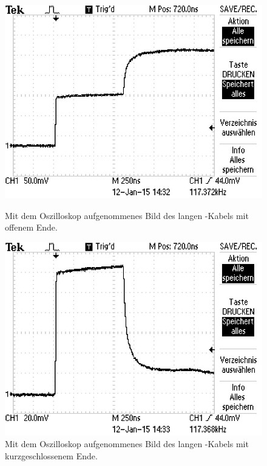 \begin{figure}[ht]
  \centering
  \includegraphics[scale=0.5]{bilder/reflexion/F0004TEK.JPG}
  \caption{Mit dem Oszilloskop aufgenommenes Bild des langen \CU-Kabels mit
  offenem Ende.}
  \label{fig:oszi_50l_offen}
  \vspace{2em}
  \includegraphics[scale=0.5]{bilder/reflexion/F0005TEK.JPG}
  \caption{Mit dem Oszilloskop aufgenommenes Bild des langen \CU-Kabels mit
  kurzgeschlossenem Ende.}
  \label{fig:oszi_50l_kurz}
\end{figure}


